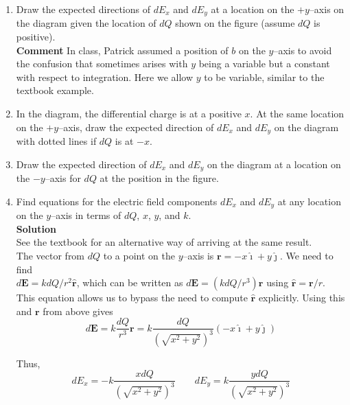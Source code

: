 \documentclass{article}
\newcommand{\ds}[0]{\displaystyle}
\newcommand{\ihat}[0]{\hat{\boldsymbol{\imath}}}
\newcommand{\jhat}[0]{\hat{\boldsymbol{\jmath}}}
\newcommand{\rhat}[0]{\hat{\mathbf{r}}}
\begin{document}
\begin{enumerate}

  \item Draw the expected directions of $dE_x$ and $dE_y$ at a location on the $+y$--axis on the diagram given the location of $dQ$ shown on the figure (assume $dQ$ is positive).\\

        \textbf{Comment} In class, Patrick assumed a position of $b$ on the $y$--axis to avoid the confusion that sometimes arises with $y$ being a variable but a constant with respect to integration. Here we allow $y$ to be variable, similar to the textbook example.

  \item In the diagram, the differential charge is at a positive $x$. At the same location on the $+y$--axis, draw the expected direction of $dE_x$ and $dE_y$ on the diagram with dotted lines if $dQ$ is at $-x$.

  \item Draw the expected direction of $dE_x$ and $dE_y$ on the diagram at a location on the $-y$--axis for $dQ$ at the position in the figure.

  \item Find equations for the electric field components $dE_x$ and $dE_y$ at any location on the $y$--axis in terms of $dQ$, $x$, $y$, and $k$.\\

        \textbf{Solution}\\

        See the textbook for an alternative way of arriving at the same result.\\

        The vector from $dQ$ to a point on the $y$--axis is $\mathbf{r}=-x\ihat+y\jhat$. We need to find\\

        $\ds d\mathbf{E} = k{dQ}/{r^2}\hat{\mathbf{r}}$, which can be written as $\ds d\mathbf{E}=( k{dQ}/{r^3})\mathbf{r}$ using $\rhat=\mathbf{r}/r$. This equation allows us to bypass the need to compute $\rhat$ explicitly. Using this and $\mathbf{r}$ from above gives\\

        \begin{equation}
          d\mathbf{E} = k\frac{dQ}{r^3}\mathbf{r} = k\frac{dQ}{(\sqrt{x^2+y^2})^3}(-x\ihat+y\jhat)
        \end{equation}

        Thus,\\

        \begin{equation}
          \ds dE_x = -k\frac{xdQ}{(\sqrt{x^2+y^2})^3}\qquad dE_y = k\frac{ydQ}{(\sqrt{x^2+y^2})^3}
        \end{equation}

\end{enumerate}
\end{document}
